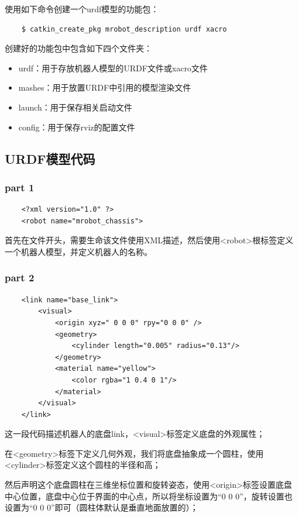 \documentclass[10pt, oneside]{book}
\begin{document}
使用如下命令创建一个urdf模型的功能包：

\begin{verbatim}
    $ catkin_create_pkg mrobot_description urdf xacro
\end{verbatim}

创建好的功能包中包含如下四个文件夹：

\begin{itemize}
    \item urdf：用于存放机器人模型的URDF文件或xacro文件
    \item mashes：用于放置URDF中引用的模型渲染文件
    \item launch：用于保存相关启动文件
    \item config：用于保存rviz的配置文件
\end{itemize}

\subsection{URDF模型代码}

\subsubsection{part 1}

\begin{verbatim}
    <?xml version="1.0" ?>
    <robot name="mrobot_chassis">
\end{verbatim}

首先在文件开头，需要生命该文件使用XML描述，然后使用<robot>根标签定义一个机器人模型，并定义机器人的名称。

\subsubsection{part 2}
\begin{verbatim}
    <link name="base_link">
        <visual>
            <origin xyz=" 0 0 0" rpy="0 0 0" />
            <geometry>
                <cylinder length="0.005" radius="0.13"/>
            </geometry>
            <material name="yellow">
                <color rgba="1 0.4 0 1"/>
            </material>
        </visual>
    </link>
\end{verbatim}

这一段代码描述机器人的底盘link，<visual>标签定义底盘的外观属性；

在<geometry>标签下定义几何外观，我们将底盘抽象成一个圆柱，使用<cylinder>标签定义这个圆柱的半径和高；

然后声明这个底盘圆柱在三维坐标位置和旋转姿态，使用<origin>标签设置底盘中心位置，底盘中心位于界面的中心点，所以将坐标设置为“0 0 0”，旋转设置也设置为“0 0 0”即可（圆柱体默认是垂直地面放置的）；
\end{document}
